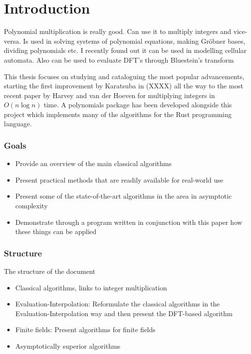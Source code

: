 \chapter{Introduction}\label{introduction}


Polynomial multiplication is really good. Can use it to multiply integers and vice-versa. Is used in solving systems of polynomial equations, making Gr\"{o}bner bases, dividing polynomials etc. I recently found out it can be used in modelling cellular automata. Also can be used to evaluate DFT's through Bluestein's transform

This thesis focuses on studying and cataloguing the most popular advancements, starting the first improvement by Karatsuba in (XXXX) all the way to the most recent paper by Harvey and van der Hoeven for multiplying integers in $O(n\log n)$ time. A polynomials package has been developed alongside this project which implements many of the algorithms for the Rust programming language.

\subsection{Goals}%
\label{sub:goals}

\begin{itemize}
    \item Provide an overview of the main classical algorithms
    \item Present practical methods that are readily available for real-world use
    \item Present some of the state-of-the-art algorithms in the area in asymptotic complexity
    \item Demonstrate through a program written in conjunction with this paper how these things can be applied
\end{itemize}


\subsection{Structure}%
\label{sub:Structure}

The structure of the document

\begin{itemize}
    \item Classical algorithms, links to integer multiplication
    \item Evaluation-Interpolation: Reformulate the classical algorithms in the Evaluation-Interpolation way and then present the DFT-based algorithm
    \item Finite fields: Present algorithms for finite fields
    \item Asymptotically superior algorithms
\end{itemize}
